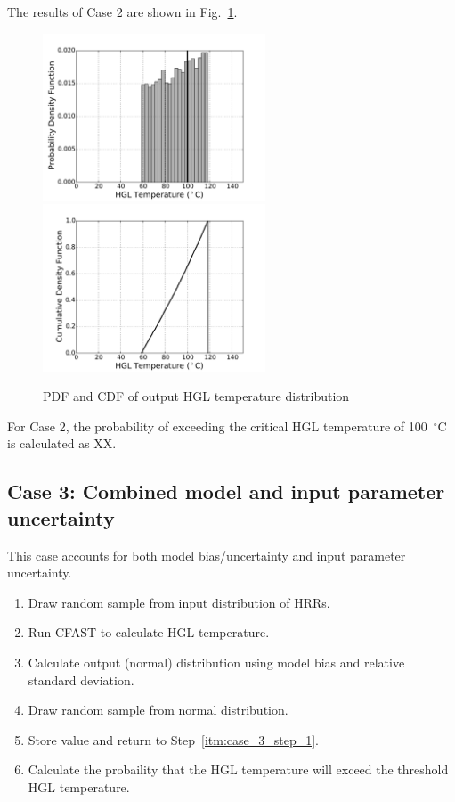 \documentclass[12pt]{article}
\begin{document}
The results of Case 2 are shown in Fig.~\ref{fig:case_2_output_distributions}.

\begin{figure}[!ht]
\includegraphics[width=2.6in]{Figures/output_PDF_2_input}
\includegraphics[width=2.6in]{Figures/output_CDF_2_input}
\caption{PDF and CDF of output HGL temperature distribution}
\label{fig:case_2_output_distributions}
\end{figure}

For Case 2, the probability of exceeding the critical HGL temperature of 100~$^\circ$C is calculated as XX.


\clearpage


\subsection{Case 3: Combined model and input parameter uncertainty}

This case accounts for both model bias/uncertainty and input parameter uncertainty.

\begin{enumerate}
\item Draw random sample from input distribution of HRRs.
\label{itm:case_3_step_1}
\item Run CFAST to calculate HGL temperature.
\item Calculate output (normal) distribution using model bias and relative standard deviation.
\item Draw random sample from normal distribution.
\item Store value and return to Step~\ref{itm:case_3_step_1}.
\item Calculate the probaility that the HGL temperature will exceed the threshold HGL temperature.
\end{enumerate}
\end{document}
